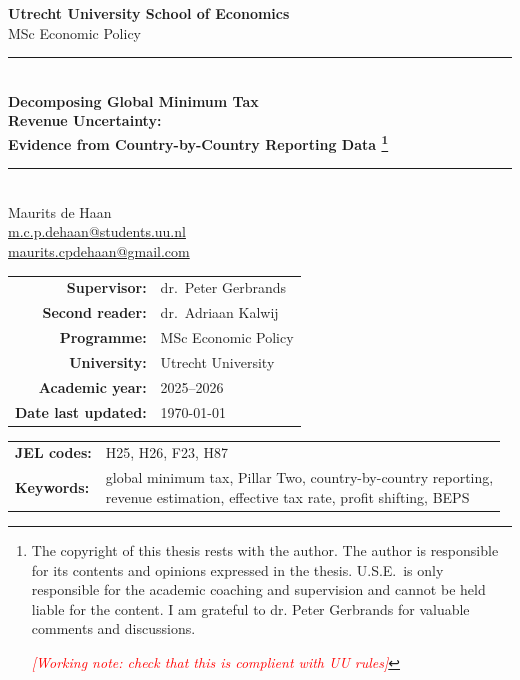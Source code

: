 \documentclass[11pt,a4paper]{article}
\newcommand{\workingnote}[1]{\ifworkingdoc\par\noindent\textcolor{red}{\textit{[Working note: #1]}}\par\fi}
\begin{document}
\begin{titlepage}
  \thispagestyle{empty}
  \begin{center}

    \vspace*{1.5em}
    {\large\bfseries Utrecht University School of Economics}\\[0.3em]
    {\normalsize MSc Economic Policy}\\[3em]

    \rule{\textwidth}{1pt}\\[1.2em]

    {\LARGE\bfseries
      Decomposing Global Minimum Tax\\[0.3em]
      Revenue Uncertainty:\\[0.5em]
      \large\bfseries
      Evidence from Country-by-Country Reporting Data%
      \footnote{The copyright of this thesis rests with the author. The author is responsible for its contents and opinions expressed in the thesis. U.S.E.\ is only responsible for the academic coaching and supervision and cannot be held liable for the content. I am grateful to dr. Peter Gerbrands for valuable comments and discussions. \workingnote{check that this is complient with UU rules}}}%
    \\[1.2em]

    \rule{\textwidth}{1pt}\\[2.5em]

    {\large Maurits de Haan}\\[0.3em]
    {\normalsize\href{mailto:m.c.p.dehaan@students.uu.nl}
      {m.c.p.dehaan@students.uu.nl}}\\
    {\normalsize\href{mailto:maurits.cpdehaan@gmail.com}
      {maurits.cpdehaan@gmail.com}}\\[2.5em]

    \begin{tabular}{@{}rl@{}}
      \textbf{Supervisor:} & dr.\ Peter Gerbrands \\[0.4em]
      \textbf{Second reader:} & dr.\ Adriaan Kalwij \\[0.4em]
      \textbf{Programme:} & MSc Economic Policy \\[0.4em]
      \textbf{University:} & Utrecht University \\[0.4em]
      \textbf{Academic year:} & 2025--2026 \\[0.4em]
      \textbf{Date last updated:} & \today \\
    \end{tabular}

    \vfill

    \begin{tabular}{@{}ll@{}}
      \textbf{JEL codes:} &
        H25, H26, F23, H87 \\[0.5em]
      \textbf{Keywords:} &
        \parbox[t]{0.75\textwidth}{global minimum tax, Pillar Two,
        country-by-country reporting,\\
        revenue estimation, effective tax rate, profit shifting, BEPS}
    \end{tabular}

  \end{center}
\end{titlepage}
\end{document}
